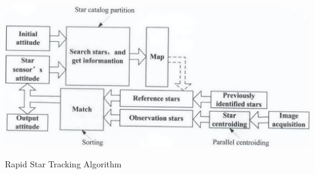 \documentclass[../../main.tex]{subfiles}
\begin{document}
\begin{Flowchart}
        \centering
        \includegraphics[scale=0.4]{Figures/GNC/rapid_tracking_flowchart.png}
        \caption{Rapid Star Tracking Algorithm}
        \label{fig:rapid_tracking_flowchart}
\end{Flowchart}
\end{document}
